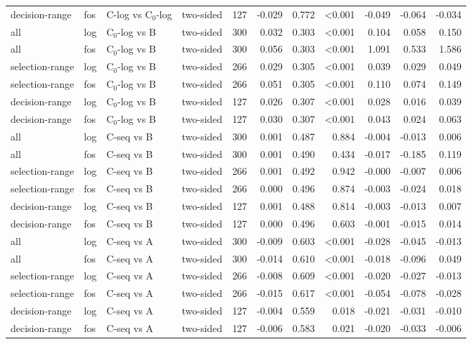 \begin{longtable}{llllrrrrrrr}
decision-range & fos & C-log vs C$_0$-log & two-sided & 127 & -0.029 & 0.772 & <0.001 & -0.049 & -0.064 & -0.034 \\
all & log & C$_0$-log vs B & two-sided & 300 & 0.032 & 0.303 & <0.001 & 0.104 & 0.058 & 0.150 \\
all & fos & C$_0$-log vs B & two-sided & 300 & 0.056 & 0.303 & <0.001 & 1.091 & 0.533 & 1.586 \\
selection-range & log & C$_0$-log vs B & two-sided & 266 & 0.029 & 0.305 & <0.001 & 0.039 & 0.029 & 0.049 \\
selection-range & fos & C$_0$-log vs B & two-sided & 266 & 0.051 & 0.305 & <0.001 & 0.110 & 0.074 & 0.149 \\
decision-range & log & C$_0$-log vs B & two-sided & 127 & 0.026 & 0.307 & <0.001 & 0.028 & 0.016 & 0.039 \\
decision-range & fos & C$_0$-log vs B & two-sided & 127 & 0.030 & 0.307 & <0.001 & 0.043 & 0.024 & 0.063 \\
all & log & C-seq vs B & two-sided & 300 & 0.001 & 0.487 & 0.884 & -0.004 & -0.013 & 0.006 \\
all & fos & C-seq vs B & two-sided & 300 & 0.001 & 0.490 & 0.434 & -0.017 & -0.185 & 0.119 \\
selection-range & log & C-seq vs B & two-sided & 266 & 0.001 & 0.492 & 0.942 & -0.000 & -0.007 & 0.006 \\
selection-range & fos & C-seq vs B & two-sided & 266 & 0.000 & 0.496 & 0.874 & -0.003 & -0.024 & 0.018 \\
decision-range & log & C-seq vs B & two-sided & 127 & 0.001 & 0.488 & 0.814 & -0.003 & -0.013 & 0.007 \\
decision-range & fos & C-seq vs B & two-sided & 127 & 0.000 & 0.496 & 0.603 & -0.001 & -0.015 & 0.014 \\
all & log & C-seq vs A & two-sided & 300 & -0.009 & 0.603 & <0.001 & -0.028 & -0.045 & -0.013 \\
all & fos & C-seq vs A & two-sided & 300 & -0.014 & 0.610 & <0.001 & -0.018 & -0.096 & 0.049 \\
selection-range & log & C-seq vs A & two-sided & 266 & -0.008 & 0.609 & <0.001 & -0.020 & -0.027 & -0.013 \\
selection-range & fos & C-seq vs A & two-sided & 266 & -0.015 & 0.617 & <0.001 & -0.054 & -0.078 & -0.028 \\
decision-range & log & C-seq vs A & two-sided & 127 & -0.004 & 0.559 & 0.018 & -0.021 & -0.031 & -0.010 \\
decision-range & fos & C-seq vs A & two-sided & 127 & -0.006 & 0.583 & 0.021 & -0.020 & -0.033 & -0.006 \\

\end{longtable}

